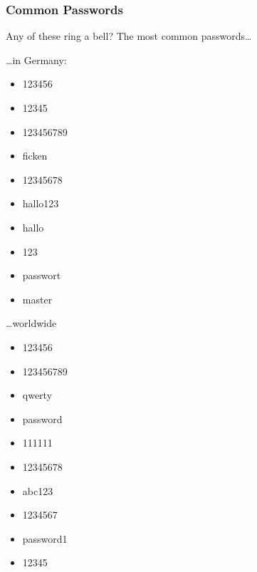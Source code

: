 \documentclass[aspectratio=169,dvipsnames]{beamer}
\begin{document}
\begin{frame}
\frametitle{Common Passwords}
Any of these ring a bell? The most common passwords\dots
\bigskip\bigskip

\begin{minipage}{0.5\textwidth}
\begin{center}
\dots in Germany:
\end{center}
\bigskip

\begin{minipage}{0.5\textwidth}
\begin{itemize}
\item 123456
\item 12345
\item 123456789
\item ficken
\item 12345678
\end{itemize}
\end{minipage}%
\begin{minipage}{0.5\textwidth}
\begin{itemize}
\item hallo123
\item hallo
\item 123
\item passwort
\item master
\end{itemize}
\end{minipage}
\end{minipage}%
\begin{minipage}{0.5\textwidth}
\begin{center}
\dots worldwide
\end{center}
\bigskip

\begin{minipage}{0.5\textwidth}
\begin{itemize}
\item 123456
\item 123456789
\item qwerty
\item password
\item 111111
\end{itemize}
\end{minipage}%
\begin{minipage}{0.5\textwidth}
\begin{itemize}
\item 12345678
\item abc123
\item 1234567
\item password1
\item 12345
\end{itemize}
\end{minipage}
\end{minipage}

\end{frame}
\end{document}
